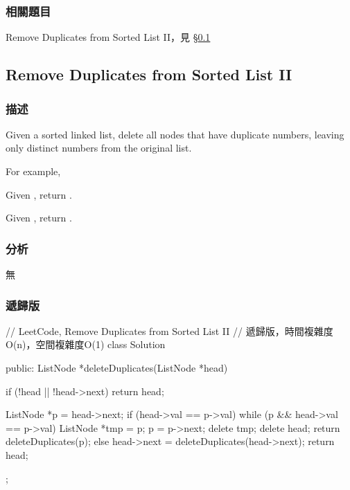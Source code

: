 \subsubsection{相關題目}

\begindot
\item Remove Duplicates from Sorted List II，見 \S \ref{sec:remove-duplicates-from-sorted-list-ii}
\myenddot


\subsection{Remove Duplicates from Sorted List II}
\label{sec:remove-duplicates-from-sorted-list-ii}


\subsubsection{描述}
Given a sorted linked list, delete all nodes that have duplicate numbers, leaving only distinct numbers from the original list.

For example,

Given , return .

Given , return .


\subsubsection{分析}
無


\subsubsection{遞歸版}
\begin{Code}
// LeetCode, Remove Duplicates from Sorted List II
// 遞歸版，時間複雜度O(n)，空間複雜度O(1)
class Solution {
public:
    ListNode *deleteDuplicates(ListNode *head) {
        if (!head || !head->next) return head;

        ListNode *p = head->next;
        if (head->val == p->val) {
            while (p && head->val == p->val) {
                ListNode *tmp = p;
                p = p->next;
                delete tmp;
            }
            delete head;
            return deleteDuplicates(p);
        } else {
            head->next = deleteDuplicates(head->next);
            return head;
        }
    }
};
\end{Code}



